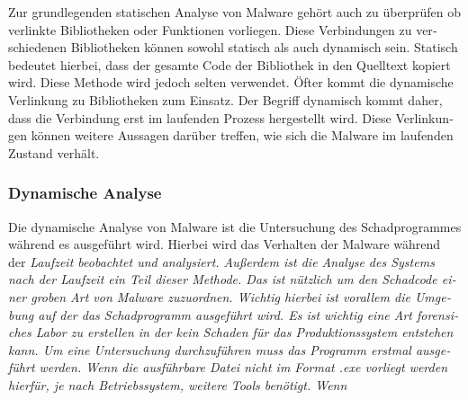 \begin{otherlanguage}{ngerman}
\newline 
Zur grundlegenden statischen Analyse von Malware gehört auch zu überprüfen ob verlinkte Bibliotheken oder Funktionen vorliegen. Diese Verbindungen zu verschiedenen Bibliotheken können sowohl statisch als auch dynamisch sein. Statisch bedeutet hierbei, dass der gesamte Code der Bibliothek in den Quelltext kopiert wird. Diese Methode wird jedoch selten verwendet. Öfter kommt die dynamische Verlinkung zu Bibliotheken zum Einsatz. Der Begriff \dq dynamisch \dq{} kommt daher, dass die Verbindung erst im laufenden Prozess hergestellt wird. Diese Verlinkungen können weitere Aussagen darüber treffen, wie sich die Malware im laufenden Zustand verhält.
\subsubsection{Dynamische Analyse}
Die dynamische Analyse von Malware ist die Untersuchung des Schadprogrammes während es ausgeführt wird. Hierbei wird das Verhalten der Malware während der \it Laufzeit \rm beobachtet und analysiert. Außerdem ist die Analyse des Systems nach der Laufzeit ein Teil dieser Methode. Das ist nützlich um den Schadcode einer groben Art von Malware zuzuordnen. Wichtig hierbei ist vorallem die Umgebung auf der das Schadprogramm ausgeführt wird. Es ist wichtig eine Art \it forensiches Labor \rm zu erstellen in der kein Schaden für das Produktionssystem entstehen kann. 
\newline
Um eine Untersuchung durchzuführen muss das Programm erstmal ausgeführt werden. Wenn die ausführbare Datei nicht im Format \dq .exe\dq{} vorliegt werden hierfür, je nach Betriebssystem, weitere Tools benötigt. Wenn 


\end{otherlanguage}
